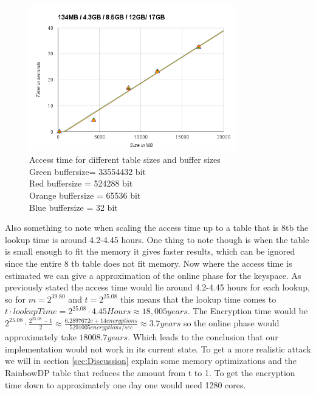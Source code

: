 \begin{figure}[th]
  \centering
  \includegraphics[width=0.8\textwidth]{figures/AccessTime.png}
  \caption{Access time for different table sizes and buffer sizes\\
    Green buffersize= 33554432 bit\\
    Red buffersize = 524288 bit\\
    Orange buffersize = 65536 bit\\
    Blue buffersize = 32 bit\\
    }
  \label{fig:tableAccess}
\end{figure}

Also something to note when scaling the access time up to a table that is 8tb the lookup time is around 4.2-4.45 hours.
One thing to note though is when the table is small enough to fit the memory it gives faster results, which can be ignored since the entire 8 tb table does not fit memory. Now where the access time is estimated we can give a approximation of the online phase for the  keyspace. As previously stated the access time would lie around 4.2-4.45 hours for each lookup, so for $m=2^{39.80}$ and $t=2^{25.08}$ this means that the lookup time comes to $t\cdot lookupTime=2^{25.08}\cdot 4.45 Hours \approx 18,005 years$. The Encryption time would be $2^{25.08}\cdot\frac{2^{25.08}-1}{2}\approx \frac{6.2897672e+14 encryptions}{5291005 encryptions/sec} \approx 3.7 years$ so the online phase would approximately take $18008.7 years$. Which leads to the conclusion that our implementation would not work in its current state. To get a more realistic attack we will in section \ref{sec:Discussion} explain some memory optimizations and the RainbowDP table that reduces the amount from t to 1. To get the encryption time down to approximately one day one would need 1280 cores.


